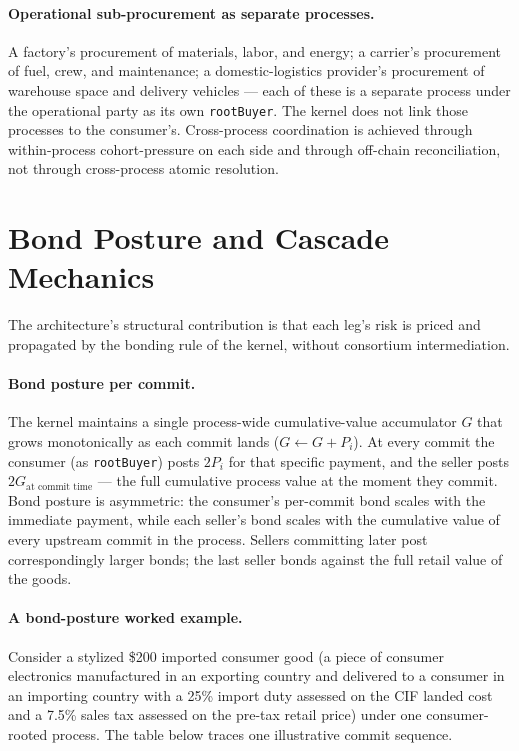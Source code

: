 \documentclass[11pt,a4paper]{article}
\theoremstyle{definition}
\theoremstyle{remark}
\begin{document}
\paragraph{Operational sub-procurement as separate processes.}
A factory's procurement of materials, labor, and energy; a
carrier's procurement of fuel, crew, and maintenance; a
domestic-logistics provider's procurement of warehouse space and
delivery vehicles --- each of these is a separate process under
the operational party as its own \texttt{rootBuyer}. The kernel
does not link those processes to the consumer's. Cross-process
coordination is achieved through within-process cohort-pressure
on each side and through off-chain reconciliation, not through
cross-process atomic resolution.

\section{Bond Posture and Cascade Mechanics}
\label{sec:bonds}

The architecture's structural contribution is that each leg's
risk is priced and propagated by the bonding rule of the kernel,
without consortium intermediation.

\paragraph{Bond posture per commit.}
The kernel maintains a single process-wide cumulative-value
accumulator $G$ that grows monotonically as each commit lands
($G \leftarrow G + P_i$). At every commit the consumer (as
\texttt{rootBuyer}) posts $2P_i$ for that specific payment, and
the seller posts $2G_{\text{at commit time}}$ --- the full
cumulative process value at the moment they commit. Bond posture
is asymmetric: the consumer's per-commit bond scales with the
immediate payment, while each seller's bond scales with the
cumulative value of every upstream commit in the process.
Sellers committing later post correspondingly larger bonds; the
last seller bonds against the full retail value of the goods.

\paragraph{A bond-posture worked example.}
Consider a stylized \$200 imported consumer good (a piece of
consumer electronics manufactured in an exporting country and
delivered to a consumer in an importing country with a 25\%
import duty assessed on the CIF landed cost and a 7.5\% sales
tax assessed on the pre-tax retail price) under one
consumer-rooted process. The table below traces one illustrative
commit sequence.
\end{document}

